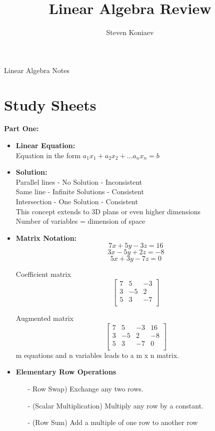 \documentclass[12pt]{article}
\title{Linear Algebra Review}
\author{Steven Koniaev}
\begin{document}
	\begin{center}
		Linear Algebra Notes
	\end{center}
	
	\section*{Study Sheets}
	
	\begin{flushleft}
		\textbf{Part One:} \\
		\begin{itemize}
			\item \textbf{Linear Equation: } \\ Equation in the form $a_1x_1+a_2x_2 + \ldots a_nx_n = b$
			\item \textbf{Solution: } \\ Parallel lines - No Solution - Inconsistent 
			\\ Same line - Infinite Solutions - Consistent \\ Intersection - One Solution - Consistent \\ This concept extends to 3D plans or even higher dimensions \\Number of variables = dimension of space
		\item \textbf{Matrix Notation: }
				$$ 7x + 5y - 3z = 16$$
				$$3x-5y + 2z = -8 $$
				$$5x + 3y - 7z = 0 $$
				
				\begin{center}
					Coefficient matrix
				$$\begin{bmatrix}
					7 & 5 & -3 \\
					3 & -5 & 2 \\
					5 & 3 & -7 \\
				\end{bmatrix}$$
			
			
				
					Augmented matrix
				$$\begin{bmatrix}
					7 & 5 & -3  & 16\\
					3 & -5 & 2 & -8\\
					5 & 3 & -7 & 0\\
				\end{bmatrix}$$
			m equations and n variables leads to a m x n matrix.
			
		\end{center}
	
			\item \textbf{Elementary Row Operations}\\
			\begin{itemize}
				\item[-]Row Swap) Exchange any two rows.
				\item[-](Scalar Multiplication) Multiply any row by a constant.
				\item[-](Row Sum) Add a multiple of one row to another row
			\end{itemize}
		

\end{itemize}
\end{flushleft}
\end{document}
